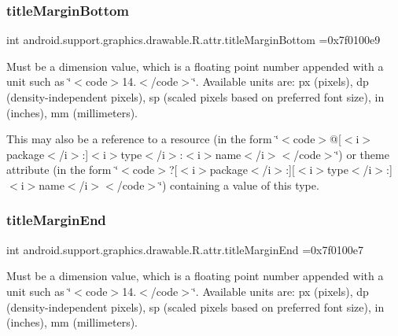 \subsubsection{\texorpdfstring{title\+Margin\+Bottom}{titleMarginBottom}}
{\footnotesize\ttfamily int android.\+support.\+graphics.\+drawable.\+R.\+attr.\+title\+Margin\+Bottom =0x7f0100e9\hspace{0.3cm}{\ttfamily [static]}}

Must be a dimension value, which is a floating point number appended with a unit such as \char`\"{}$<$code$>$14.\+5sp$<$/code$>$\char`\"{}. Available units are\+: px (pixels), dp (density-\/independent pixels), sp (scaled pixels based on preferred font size), in (inches), mm (millimeters). 

This may also be a reference to a resource (in the form \char`\"{}$<$code$>$@\mbox{[}$<$i$>$package$<$/i$>$\+:\mbox{]}$<$i$>$type$<$/i$>$\+:$<$i$>$name$<$/i$>$$<$/code$>$\char`\"{}) or theme attribute (in the form \char`\"{}$<$code$>$?\mbox{[}$<$i$>$package$<$/i$>$\+:\mbox{]}\mbox{[}$<$i$>$type$<$/i$>$\+:\mbox{]}$<$i$>$name$<$/i$>$$<$/code$>$\char`\"{}) containing a value of this type. \mbox{\label{classandroid_1_1support_1_1graphics_1_1drawable_1_1R_1_1attr_ae5e843a814ff7ec2bfbe144baa81ff5c}} 
\subsubsection{\texorpdfstring{title\+Margin\+End}{titleMarginEnd}}
{\footnotesize\ttfamily int android.\+support.\+graphics.\+drawable.\+R.\+attr.\+title\+Margin\+End =0x7f0100e7\hspace{0.3cm}{\ttfamily [static]}}

Must be a dimension value, which is a floating point number appended with a unit such as \char`\"{}$<$code$>$14.\+5sp$<$/code$>$\char`\"{}. Available units are\+: px (pixels), dp (density-\/independent pixels), sp (scaled pixels based on preferred font size), in (inches), mm (millimeters). 

